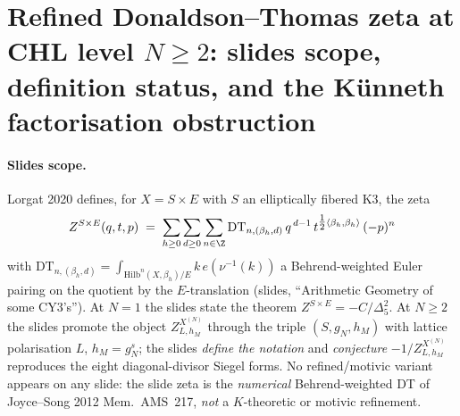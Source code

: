 
\section{Refined Donaldson--Thomas zeta at CHL level
\texorpdfstring{$N\geq 2$}{N geq 2}:
slides scope, definition status, and
the K\"unneth factorisation obstruction}
\label{wn:sec:refined-DT-wave8-l2-N-ge-2}

\providecommand{\ClaimStatusTheorem}{\textbf{[Thm]}}
\providecommand{\ClaimStatusConjectured}{\textbf{[Conj]}}
\providecommand{\ClaimStatusAxiomatic}{\textbf{[Ax]}}
\providecommand{\Hilb}{\mathrm{Hilb}}
\providecommand{\DT}{\mathrm{DT}}
\providecommand{\ZDT}{Z^{X}}
\providecommand{\ZDTN}{Z^{X^{(N)}}_{L, h_M}}

\paragraph{Slides scope.} Lorgat 2020 defines, for $X=S\times E$ with
$S$ an elliptically fibered K3, the zeta
\[
  Z^{S\times E}(q,t,p)
  \;=\; \sum_{h\geq 0}\sum_{d\geq 0}\sum_{n\in\Z}
        \DT_{n,(\beta_h,d)}\,q^{\,d-1}\,t^{\tfrac{1}{2}\langle\beta_h,\beta_h\rangle}\,(-p)^n
\]
with $\DT_{n,(\beta_h,d)}=\int_{\Hilb^n(X,\beta_h)/E}k\,e(\nu^{-1}(k))$
a Behrend-weighted Euler pairing on the quotient by the $E$-translation
(slides, ``Arithmetic Geometry of some CY3's''). At $N=1$ the slides
state the theorem $Z^{S\times E}=-C/\Delta_5^{2}$. At $N\geq 2$ the
slides promote the object $Z^{X^{(N)}}_{L,h_M}$ through the triple
$(S,g_N,h_M)$ with lattice polarisation $L$, $h_M=g_N^s$; the slides
\emph{define the notation} and \emph{conjecture}
$-1/Z^{X^{(N)}}_{L,h_M}$ reproduces the eight diagonal-divisor Siegel
forms. No refined/motivic variant appears on any slide: the slide zeta
is the \emph{numerical} Behrend-weighted DT of Joyce--Song 2012
Mem.~AMS~217, \emph{not} a $K$-theoretic or motivic refinement.

